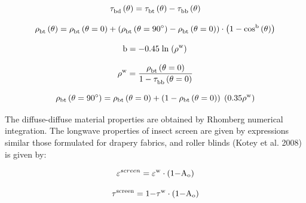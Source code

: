 {\begin{equation}
{\rm{\tau }}_{{\rm{bd}}}^{}\left( {\rm{\theta }} \right) = {\rm{\tau }}_{{\rm{bt}}}^{}\left( {\rm{\theta }} \right) - {\rm{\tau }}_{{\rm{bb}}}^{}\left( {\rm{\theta }} \right)
\end{equation}

\begin{equation}
{\rm{\rho }}_{{\rm{bt}}}^{}\left( {\rm{\theta }} \right) = {\rm{\rho }}_{{\rm{bt}}}^{}\left( {{\rm{\theta }} = {\rm{0}}} \right) + \left( {{\rm{\rho }}_{{\rm{bt}}}^{}\left( {{\rm{\theta }} = 9{\rm{0}}^\circ } \right) - {\rm{\rho }}_{{\rm{bt}}}^{}\left( {{\rm{\theta }} = {\rm{0}}} \right)} \right) \cdot \left( {1 - {\rm{co}}{{\rm{s}}^{\rm{b}}}\left( {\rm{\theta }} \right)} \right)
\end{equation}

\begin{equation}
{\rm{b}} =  - {\rm{0}}{\rm{.45}}\;{\rm{ln}}\;{\left( {{{\rm{\rho }}^{\rm{w}}}} \right)^{}}
\end{equation}

\begin{equation}
{\rm{\rho }}_{}^{\rm{w}} = \frac{{{\rm{\rho }}_{{\rm{bt}}}^{}\left( {{\rm{\theta }} = {\rm{0}}} \right)}}{{{\rm{1}} - {\rm{\tau }}_{{\rm{bb}}}^{}\left( {{\rm{\theta }} = {\rm{0}}} \right)}}
\end{equation}

\begin{equation}
{\rho_{{\rm{bt}}}}\left( {{\rm{\theta }} = {\rm{90}}^\circ } \right) = {\rho_{{\rm{bt}}}}\left( {{\rm{\theta }} = {\rm{0}}} \right) + \left( {1 - {\rho_{{\rm{bt}}}}\left( {{\rm{\theta }} = {\rm{0}}} \right)} \right)\;\left( {{\rm{0}}{\rm{.35}}{\rho ^{\rm{w}}}} \right)
\end{equation}

The diffuse-diffuse material properties are obtained by Rhomberg numerical integration. The longwave properties of insect screen are given by expressions similar those formulated for drapery fabrics, and roller blinds (Kotey et al. 2008) is given by:

\begin{equation}
{\varepsilon ^{screen}} = {\varepsilon ^{\rm{w}}} \cdot \left( {{\rm{1  -  }}{{\rm{A}}_{\rm{o}}}} \right)
\end{equation}

\begin{equation}
{\tau ^{{\rm{screen}}}} = {\rm{1 - }}{\tau ^{\rm{w}}} \cdot \left( {{\rm{1  -  }}{{\rm{A}}_{\rm{o}}}} \right)
\end{equation}

}
